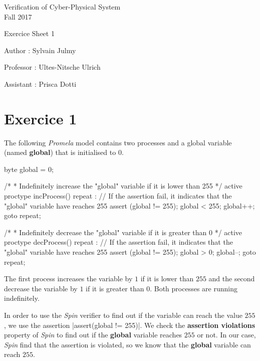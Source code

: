 \documentclass[a4paper,11pt]{report}
\author{Sylvain Julmy}
\date{\today}
\begin{document}
\begin{center}
\Large{
    Verification of Cyber-Physical System\\
    Fall 2017
  }
  
  \noindent\makebox[\linewidth]{\rule{\linewidth}{0.4pt}}
  Exercice Sheet 1

  \vspace*{1.4cm}

  Author : Sylvain Julmy
  \noindent\makebox[\linewidth]{\rule{\linewidth}{0.4pt}}

  \begin{flushleft}
    Professor : Ultes-Nitsche Ulrich
    
    Assistant : Prisca Dotti
  \end{flushleft}

  \noindent\makebox[\linewidth]{\rule{\textwidth}{1pt}}
\end{center}

\section*{Exercice 1}

The following \textit{Promela} model contains two processes and a global
variable (named \textbf{global}) that is initialised to $0$.

\begin{listing}[H]
\centering
\begin{promelacode}
byte global = 0;

/*
 * Indefinitely increase the "global" variable if it is lower than 255
 */
active proctype incProcess() {
    repeat :
    // If the assertion fail, it indicates that the "global" variable have reaches 255
    assert (global != 255);
    global < 255;
    global++;
    goto repeat;
}

/*
 * Indefinitely decrease the "global" variable if it is greater than 0
 */
active proctype decProcess() {
    repeat :
    // If the assertion fail, it indicates that the "global" variable have reaches 255
    assert (global != 255);
    global > 0;
    global--;
    goto repeat;
}
\end{promelacode}
\end{listing}

The first process increases the variable by $1$ if it is lower than $255$ and the
second decrease the variable by $1$ if it is greater than $0$. Both processes are
running indefinitely.

In order to use the \textit{Spin} verifier to find out if the variable can reach
the value $255$, we use the assertion \promelainline|assert(global != 255)|. We
check the \textbf{assertion violations} property of \textit{Spin} to find out if
the \textbf{global} variable reaches $255$ or not. In our case, \textit{Spin}
find that the assertion is violated, so we know that the \textbf{global}
variable can reach $255$.
\end{document}
